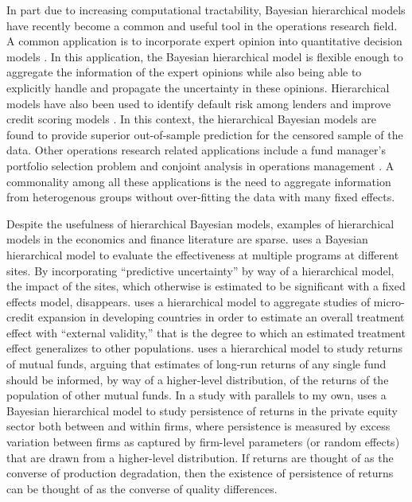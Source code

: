 \documentclass[a4paper]{article}
\begin{document}
In part due to increasing computational tractability, Bayesian hierarchical models have recently become a common and useful tool in the operations research field. A common application is to incorporate expert opinion into quantitative decision models \citep{rufo_merging_2010, szwed_bayesian_2006, utkin_method_2006}. In this application, the Bayesian hierarchical model is flexible enough to aggregate the information of the expert opinions while also being able to explicitly handle and propagate the uncertainty in these opinions. Hierarchical models have also been used to identify default risk among lenders and improve credit scoring models \citep{liu_identifying_2015, bhattacharya_bayesian_2019}. In this context, the hierarchical Bayesian models are found to provide superior out-of-sample prediction for the censored sample of the data. Other operations research related applications include a fund manager's portfolio selection problem \citep{soyer_bayesian_2006, bodnar_bayesian_2017} and conjoint analysis in operations management \citep{karniouchina_issues_2009, gensler_willingness--pay_2012}. A commonality among all these applications is the need to aggregate information from heterogenous groups without over-fitting the data with many fixed effects.

Despite the usefulness of hierarchical Bayesian models, examples of hierarchical models in the economics and finance literature are sparse. \citet{dehejia_was_2003} uses a Bayesian hierarchical model to evaluate the effectiveness at multiple programs at different sites. By incorporating ``predictive uncertainty'' by way of a hierarchical model, the impact of the sites, which otherwise is estimated to be significant with a fixed effects model, disappears. \citet{meager_understanding_2018} uses a hierarchical model to aggregate studies of micro-credit expansion in developing countries in order to estimate an overall treatment effect with ``external validity,'' that is the degree to which an estimated treatment effect generalizes to other populations. \citet{jones_mutual_2005} uses a hierarchical model to study returns of mutual funds, arguing that estimates of long-run returns of any single fund should be informed, by way of a higher-level distribution, of the returns of the population of other mutual funds. In a study with parallels to my own, \citet{korteweg_skill_2017} uses a Bayesian hierarchical model to study persistence of returns in the private equity sector both between and within firms, where persistence is measured by excess variation between firms as captured by firm-level parameters (or random effects) that are drawn from a higher-level distribution. If returns are thought of as the converse of production degradation, then the existence of persistence of returns can be thought of as the converse of quality differences.
\end{document}
